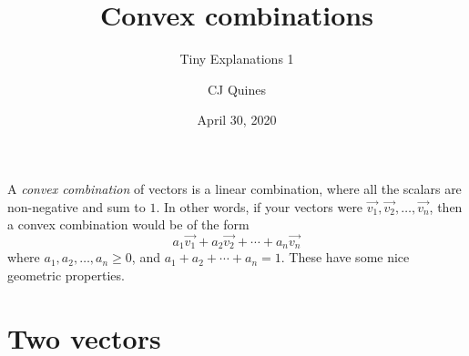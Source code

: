 \documentclass[11pt,paper=letter]{scrartcl}
\begin{document}
\title{Convex combinations}
\subtitle{Tiny Explanations 1}
\author{CJ Quines}
\date{April 30, 2020}

\maketitle

A \textit{convex combination} of vectors is a linear combination, where all the scalars are non-negative and sum to $1$. In other words, if your vectors were $\vec{v_1}, \vec{v_2}, \ldots, \vec{v_n}$, then a convex combination would be of the form \[
  a_1\vec{v_1} + a_2\vec{v_2} + \cdots + a_n\vec{v_n}
\]
where $a_1, a_2, \ldots, a_n \ge 0$, and $a_1 + a_2 + \cdots + a_n = 1$. These have some nice geometric properties.

\section{Two vectors}
\end{document}
